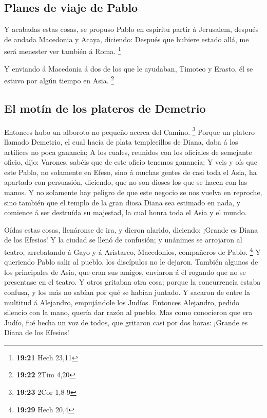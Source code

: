 \hypertarget{planes-de-viaje-de-pablo}{%
\subsection{Planes de viaje de Pablo}\label{planes-de-viaje-de-pablo}}

 Y acabadas estas cosas, se propuso Pablo en espíritu
partir á Jerusalem, después de andada Macedonia y Acaya, diciendo:
Después que hubiere estado allá, me será menester ver también á Roma.
\footnote{\textbf{19:21} Hech 23,11}

 Y enviando á Macedonia á dos de los que le ayudaban,
Timoteo y Erasto, él se estuvo por algún tiempo en Asia. \footnote{\textbf{19:22}
  2Tim 4,20}

\hypertarget{el-motuxedn-de-los-plateros-de-demetrio}{%
\subsection{El motín de los plateros de
Demetrio}\label{el-motuxedn-de-los-plateros-de-demetrio}}

 Entonces hubo un alboroto no pequeño acerca del Camino.
\footnote{\textbf{19:23} 2Cor 1,8-9}  Porque un platero
llamado Demetrio, el cual hacía de plata templecillos de Diana, daba á
los artífices no poca ganancia;  A los cuales, reunidos con
los oficiales de semejante oficio, dijo: Varones, sabéis que de este
oficio tenemos ganancia;  Y veis y oís que este Pablo, no
solamente en Efeso, sino á muchas gentes de casi toda el Asia, ha
apartado con persuasión, diciendo, que no son dioses los que se hacen
con las manos.  Y no solamente hay peligro de que este
negocio se nos vuelva en reproche, sino también que el templo de la gran
diosa Diana sea estimado en nada, y comience á ser destruída su
majestad, la cual honra toda el Asia y el mundo.

 Oídas estas cosas, llenáronse de ira, y dieron alarido,
diciendo: ¡Grande es Diana de los Efesios!  Y la ciudad se
llenó de confusión; y unánimes se arrojaron al teatro, arrebatando á
Gayo y á Aristarco, Macedonios, compañeros de Pablo. \footnote{\textbf{19:29}
  Hech 20,4}  Y queriendo Pablo salir al pueblo, los
discípulos no le dejaron.  También algunos de los
principales de Asia, que eran sus amigos, enviaron á él rogando que no
se presentase en el teatro.  Y otros gritaban otra cosa;
porque la concurrencia estaba confusa, y los más no sabían por qué se
habían juntado.  Y sacaron de entre la multitud á
Alejandro, empujándole los Judíos. Entonces Alejandro, pedido silencio
con la mano, quería dar razón al pueblo.  Mas como
conocieron que era Judío, fué hecha un voz de todos, que gritaron casi
por dos horas: ¡Grande es Diana de los Efesios!

